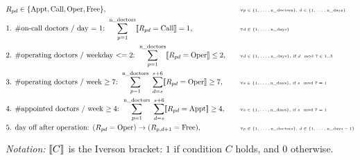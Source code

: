 \documentclass{cons-beamer}
\begin{document}
\begin{frame}
  \begin{example}
    \scriptsize
    \vspace{-1em}
    \begin{align*}
      &R_{pd} \in \{\text{Appt}, \text{Call}, \text{Oper}, \text{Free} \}, \quad &&\text{\tiny $\forall p \in \{1, \dots, {\text{n\_doctors}}\}, \, d \in \{1, \dots, {\text{n\_days}}\}$} \\
      &\text{1. \#on-call doctors / day = 1: } 
      \sum_{p=1}^{{\text{n\_doctors}}} \llbracket R_{pd} = \text{Call} \rrbracket = 1, \quad &&\text{\tiny $\forall d \in \{1, \dots, {\text{n\_days}}\}$} \\
      &\text{2. \#operating doctors / weekday $<= 2$: } 
      \sum_{p=1}^{{\text{n\_doctors}}} \llbracket R_{pd} = \text{Oper} \rrbracket \leq 2, \quad &&\text{\tiny $\forall d \in \{1, \dots, {\text{n\_days}}\}, \, \text{if } d\mod 7 \in 1..5$} \\
      &\text{3. \#operating doctors / week $\geq 7$: } 
      \sum_{p=1}^{{\text{n\_doctors}}}~\sum_{d=s}^{s+6} \llbracket R_{pd} = \text{Oper} \rrbracket \geq 7, \quad &&\text{\tiny $\forall s \in \{1, \dots, {\text{n\_days}}\}, \, \text{if } s\mod 7 = 1$} \\
      &\text{4. \#appointed doctors / week $\geq 4$: }
      \sum_{p=1}^{{\text{n\_doctors}}}~\sum_{d=s}^{s+6} \llbracket R_{pd} = \text{Appt} \rrbracket \geq 4, \quad &&\text{\tiny $\forall s \in \{1, \dots, {\text{n\_days}}\}, \, \text{if } s\mod 7 = 1$} \\
      &\text{5. day off after operation: } 
      (R_{pd} = \text{Oper}) \rightarrow (R_{p,d+1} = \text{Free}), \quad &&\text{\tiny $\forall p \in \{1, \dots, {\text{n\_doctors}}\}, \, d \in \{1, \dots, {\text{n\_days}}-1\}$} 
    \end{align*}
  \end{example}
  \textit{Notation:} $\llbracket C \rrbracket$ is the Iverson bracket: $1$ if condition $C$ holds, and $0$ otherwise.
\end{frame}
\end{document}
